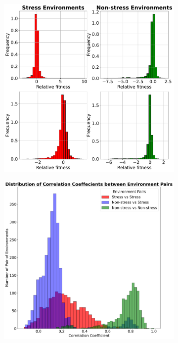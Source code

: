\documentclass[11pt]{article}
\begin{document}
\begin{figure}
\begin{subfigure}{.5\textwidth}
  \includegraphics[width=0.95\linewidth]{exp_examples.pdf}
  \caption{}
  \label{fig:sfig3a}
\end{subfigure}%
\begin{subfigure}{.5\textwidth}
  \includegraphics[width=1\linewidth]{exp_corr_samples.pdf}

\end{subfigure}
\end{figure}
\end{document}
